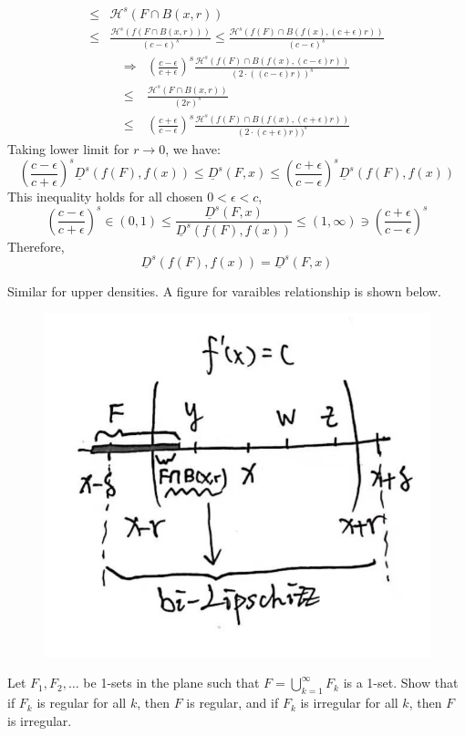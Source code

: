 \begin{customsol}{5.2}
$$\begin{aligned}
        \leq & \mathcal{H}^{s}(F \cap B(x, r)) \\
        \leq & \frac{\mathcal{H}^{s}(f(F \cap B(x, r)))}{(c-\epsilon)^{s}} \leq \frac{\mathcal{H}^{s}(f(F) \cap B(f(x),(c+\epsilon) r))}{(c-\epsilon)^{s}}
    \end{aligned}
    $$
    $$
    \begin{aligned}
        \Rightarrow &\left(\frac{c-\epsilon}{c+\epsilon}\right)^{s} \frac{\mathcal{H}^{s}(f(F) \cap B(f(x),(c-\epsilon) r))}{(2\cdot((c-\epsilon) r))^{s}} \\
        \leq & \frac{\mathcal{H}^{s}(F \cap B(x, r))}{(2 r)^{s}} \\
        \leq &\left(\frac{c+\epsilon}{c-\epsilon}\right)^{s} \frac{\mathcal{H}^{s}(f(F) \cap B(f(x),(c+\epsilon) r))}{(2\cdot(c+\epsilon) r))^{s}}
    \end{aligned}
    $$
    Taking lower limit for $r\rightarrow 0$, we have:
    $$
    \left(\frac{c-\epsilon}{c+\epsilon}\right)^{s} \underline{D}^{s}(f(F), f(x)) \leq \underline{D}^{s}(F, x) \leq\left(\frac{c+\epsilon}{c-\epsilon}\right)^{s} \underline{D}^{s}(f(F), f(x))
    $$
    This inequality holds for all chosen $0 < \epsilon < c$,
    $$
    \left(\frac{c-\epsilon}{c+\epsilon}\right)^{s} \in (0, 1) \leq \frac{\underline{D}^{s}(F, x)}{\underline{D}^{s}(f(F), f(x))} \leq (1,\infty) \ni \left(\frac{c+\epsilon}{c-\epsilon}\right)^{s}
    $$
    Therefore,
    $$
    \underline{D}^{s}(f(F), f(x))=\underline{D}^{s}(F, x)
    $$

    Similar for upper densities. 
    A figure for varaibles relationship is shown below.
    \begin{figure}[H]
        \centering
        \includegraphics[width=.35\textwidth]{images/5_2.png}
        \label{fig:e5.2}
    \end{figure}
\end{customsol}
    

\newpage
\begin{customexercise}{5.8}
    Let $F_{1}, F_{2}, \ldots$ be 1-sets in the plane such that $F=\bigcup_{k=1}^{\infty} F_{k}$ is a 1-set. Show that if $F_{k}$ is regular for all $k$, then $F$ is regular, and if $F_{k}$ is irregular for all $k$, then $F$ is irregular.
\end{customexercise}

